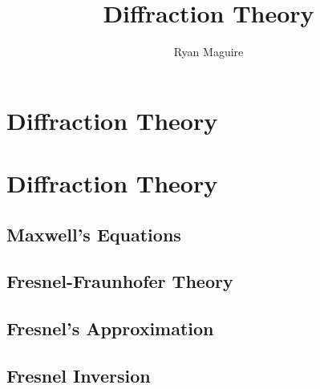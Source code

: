 \documentclass[crop=false,class=book,oneside]{standalone}
\begin{document}
    \ifx\ifplanetdiff\undefined
        \title{Diffraction Theory}
        \author{Ryan Maguire}
        \date{\vspace{-5ex}}
        \maketitle
        \tableofcontents
        \clearpage
        \chapter{Diffraction Theory}
    \else
        \chapter{Diffraction Theory}
    \fi
    \section{Maxwell's Equations}
    \section{Fresnel-Fraunhofer Theory}
    \section{Fresnel's Approximation}
    \section{Fresnel Inversion}
\end{document}

